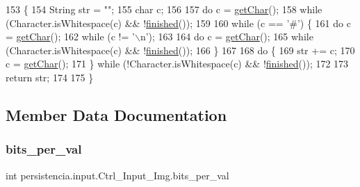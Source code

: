 \begin{DoxyCode}
153                              \{
154         String str = \textcolor{stringliteral}{""};
155         \textcolor{keywordtype}{char} c;
156 
157         \textcolor{keywordflow}{do} c = \hyperlink{classpersistencia_1_1input_1_1Ctrl__Input__Img_a85a204b05c118b07d403e9b59d7f18c0}{getChar}(); 
158         \textcolor{keywordflow}{while} (Character.isWhitespace(c) && !\hyperlink{classpersistencia_1_1input_1_1Ctrl__Input_a5a94d207dce0fd592b5ac17f55154d4f}{finished}());
159 
160         \textcolor{keywordflow}{while} (c == \textcolor{charliteral}{'#'}) \{
161             \textcolor{keywordflow}{do} c = \hyperlink{classpersistencia_1_1input_1_1Ctrl__Input__Img_a85a204b05c118b07d403e9b59d7f18c0}{getChar}();
162             \textcolor{keywordflow}{while} (c != \textcolor{charliteral}{'\(\backslash\)n'});
163 
164             \textcolor{keywordflow}{do} c = \hyperlink{classpersistencia_1_1input_1_1Ctrl__Input__Img_a85a204b05c118b07d403e9b59d7f18c0}{getChar}(); 
165             \textcolor{keywordflow}{while} (Character.isWhitespace(c) && !\hyperlink{classpersistencia_1_1input_1_1Ctrl__Input_a5a94d207dce0fd592b5ac17f55154d4f}{finished}());
166         \}
167         
168         \textcolor{keywordflow}{do} \{
169             str += c;
170             c = \hyperlink{classpersistencia_1_1input_1_1Ctrl__Input__Img_a85a204b05c118b07d403e9b59d7f18c0}{getChar}();
171         \} \textcolor{keywordflow}{while} (!Character.isWhitespace(c) && !\hyperlink{classpersistencia_1_1input_1_1Ctrl__Input_a5a94d207dce0fd592b5ac17f55154d4f}{finished}());
172 
173         \textcolor{keywordflow}{return} str;
174         
175     \}
\end{DoxyCode}


\subsection{Member Data Documentation}
\mbox{\label{classpersistencia_1_1input_1_1Ctrl__Input__Img_a222ad0e7d241e5f396cf67c3b760f143}} 
\subsubsection{\texorpdfstring{bits\+\_\+per\+\_\+val}{bits\_per\_val}}
{\footnotesize\ttfamily int persistencia.\+input.\+Ctrl\+\_\+\+Input\+\_\+\+Img.\+bits\+\_\+per\+\_\+val\hspace{0.3cm}{\ttfamily [package]}}


